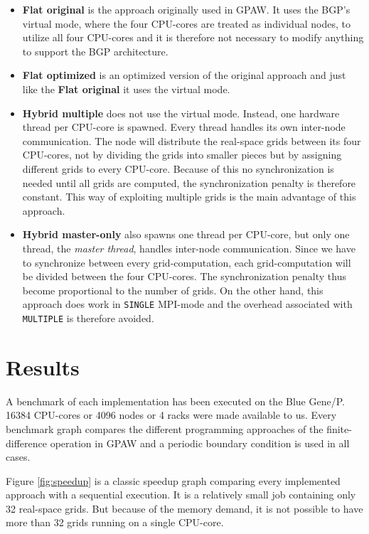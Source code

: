 \documentclass[preprint,3p,times,twocolumn]{elsarticle}
\begin{document}
\begin{itemize}
 \item \textbf{Flat original} is the approach originally used in GPAW. It uses the BGP's virtual mode, where the four CPU-cores are treated as individual nodes, to utilize all four CPU-cores and it is therefore not necessary to modify anything to support the BGP architecture.

 \item \textbf{Flat optimized} is an optimized version of the original approach and just like the \textbf{Flat original} it uses the virtual mode.

 \item \textbf{Hybrid multiple} does not use the virtual mode. Instead, one hardware thread per CPU-core is spawned. Every thread handles its own inter-node communication. The node will distribute the real-space grids between its four CPU-cores, not by dividing the grids into smaller pieces but by assigning different grids to every CPU-core. Because of this no synchronization is needed until all grids are computed, the synchronization penalty is therefore constant. This way of exploiting multiple grids is the main advantage of this approach.

 \item \textbf{Hybrid master-only} also spawns one thread per CPU-core, but only one thread, the \emph{master thread}, handles inter-node communication. Since we have to synchronize between every grid-computation, each grid-computation will be divided between the four CPU-cores. The synchronization penalty thus become proportional to the number of grids. On the other hand, this approach does work in \texttt{SINGLE} MPI-mode and the overhead associated with \texttt{MULTIPLE} is therefore avoided.
\end{itemize}

\section{Results}
A benchmark of each implementation has been executed on the Blue Gene/P. 16384 CPU-cores or 4096 nodes or 4 racks were made available to us. Every benchmark graph compares the different programming approaches of the finite-difference operation in GPAW and a periodic boundary condition is used in all cases.

Figure \ref{fig:speedup} is a classic speedup graph comparing every implemented approach with a sequential execution. It is a relatively small job containing only 32 real-space grids. But because of the memory demand, it is not possible to have more than 32 grids running on a single CPU-core.
\end{document}
